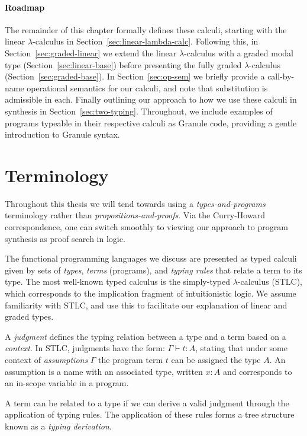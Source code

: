 \paragraph{Roadmap} The remainder of this chapter formally defines these
calculi, starting with the linear $\lambda$-calculus in
Section~\ref{sec:linear-lambda-calc}. Following this, in
Section~\ref{sec:graded-linear} we extend the linear $\lambda$-calculus with a
graded modal type (Section~\ref{sec:linear-base}) before presenting the fully
graded $\lambda$-calculus (Section~\ref{sec:graded-base}). In
Section~\ref{sec:op-sem} we briefly provide a call-by-name operational semantics
for our calculi, and note that substitution is admissible in each. Finally
outlining our approach to how we use these calculi in synthesis in
Section~\ref{sec:two-typing}. Throughout, we include examples of programs
typeable in their respective calculi as Granule code, providing a gentle
introduction to Granule syntax. 

\section{Terminology}
Throughout this thesis we will tend towards using a \textit{types-and-programs}
terminology rather than \textit{propositions-and-proofs}. Via the Curry-Howard
correspondence, one can switch smoothly to viewing our approach to program
synthesis as proof search in logic.

The functional programming languages we discuss are presented as typed
calculi given by sets of \textit{types}, \textit{terms} (programs), and \textit{typing
 rules} that relate a term to its type. The most well-known typed
calculus is the simply-typed $\lambda$-calculus (STLC), which corresponds to
the implication fragment of intuitionistic logic. We assume familiarity with STLC, and 
use this to facilitate our explanation of linear and graded types.

A \textit{judgment} defines the typing relation between a type and a term based on a
\textit{context}. In STLC, judgments have the
form: $\Gamma \vdash t : A$, stating that under some context of
\textit{assumptions} $\Gamma$ the program term $t$ can be assigned the type $A$.
An assumption is a name with an associated type, written $x : A$ and
corresponds to an in-scope variable in a program.

A term can be related to a type if we can derive a valid judgment through the
application of typing rules. The application of these rules forms a tree
structure known as a \textit{typing derivation}.

